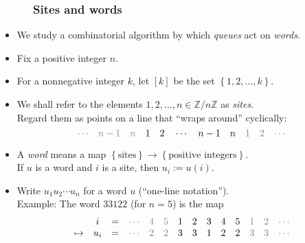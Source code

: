 \documentclass{beamer}
\newcommand{\grey}{\color{grau}}
\newcommand{\ZZ}{{\mathbb Z}}
\newcommand{\fti}[1]{\frametitle{\ \ \ \ \ #1}}
\newcommand{\set}[1]{\left\{ #1 \right\}}
\newcommand{\tup}[1]{\left( #1 \right)}
\newcommand{\ive}[1]{\left[ #1 \right]}
\newcommand{\defn}[1]{{\color{darkred}\emph{#1}}} %
\theoremstyle{plain}
\newcommand{\0}{\phantom{c}}
\begin{document}
\begin{frame}
\fti{Sites and words}

\begin{itemize}

\item We study a combinatorial algorithm by which \defn{queues} act
      on \defn{words}.  \vspace{0.3pc}

\item Fix a positive integer $n$. \pause

\item For a nonnegative integer $k$, let $\ive{k}$ be the set $\set{1, 2, \ldots, k}$. \pause

\item We shall refer to the elements $1, 2, \ldots, n \in \ZZ / n \ZZ$ as \defn{sites}. \\
Regard them as points on a line that ``wraps around'' cyclically:
\[
{\grey \cdots} \quad {\grey n-1} \quad {\grey n} \quad 1 \quad 2 \quad \cdots \quad n-1 \quad n \quad {\grey 1} \quad {\grey 2} \quad {\grey \cdots}
\]

\pause \item A \defn{word} means a map $\set{\text{sites}} \to \set{\text{positive integers}}$. \\
If $u$ is a word and $i$ is a site, then $u_i := u\tup{i}$.

\pause \item Write $u_1 u_2 \cdots u_n$ for a word $u$ (``one-line notation'').
\pause \\ Example: The word $3 3 1 2 2$ (for $n = 5$) is the map
\[
\begin{array}{cccccccccccccc}
& i & = & {\grey \cdots} & {\grey 4} & {\grey 5} & 1 & 2 & 3 & 4 & 5 & {\grey 1} & {\grey 2} & {\grey \cdots} \\
\mapsto & u_i & = & {\grey \cdots} & {\grey 2} & {\grey 2} & 3 & 3 & 1 & 2 & 2 & {\grey 3} & {\grey 3} & {\grey \cdots}
\end{array}
\]

\end{itemize}
\end{frame}
\end{document}
